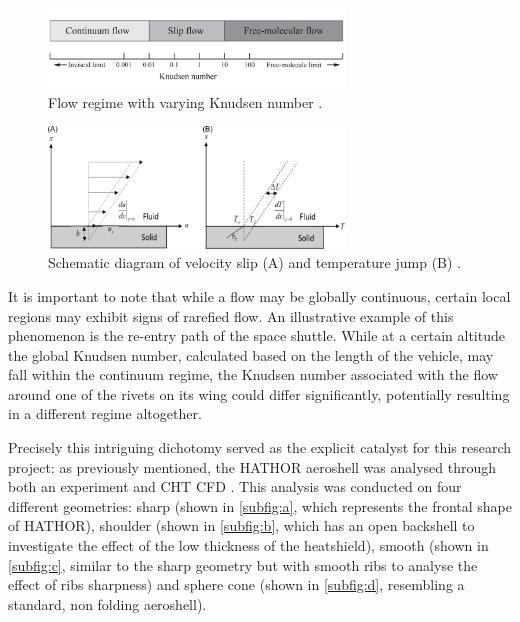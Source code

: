 \begin{figure}[ht]
    \centering
    \includegraphics[width=0.7\textwidth]{../Images/2. Background/regimes.png}
    \caption{Flow regime with varying Knudsen number \cite{aerothermonotes}.}
    \label{fig:regimes}
\end{figure}

\begin{figure}[ht]
    \centering
    \includegraphics[width=0.7\textwidth]{../Images/2. Background/slipjump.png}
    \caption{Schematic diagram of velocity slip (A) and temperature jump (B)  \cite{slipjump}.}
    \label{fig:slipjump}
\end{figure}
It is important to note that while a flow may be globally continuous, certain local regions may exhibit signs of rarefied flow. An illustrative example of this phenomenon is the re-entry path of the space shuttle. While at a certain altitude the global Knudsen number, calculated based on the length of the vehicle, may fall within the continuum regime, the Knudsen number associated with the flow around one of the rivets on its wing could differ significantly, potentially resulting in a different regime altogether.

Precisely this intriguing dichotomy served as the explicit catalyst for this research project: as previously mentioned, the HATHOR aeroshell was analysed through both an experiment and CHT CFD \cite{hathoraero2}. This analysis was conducted on four different geometries: sharp (shown in \autoref{subfig:a}, which represents the frontal shape of HATHOR), shoulder (shown in \autoref{subfig:b}, which has an open backshell to investigate the effect of the low thickness of the heatshield), smooth (shown in \autoref{subfig:c}, similar to the sharp geometry but with smooth ribs to analyse the effect of ribs sharpness) and sphere cone (shown in \autoref{subfig:d}, resembling a standard, non folding aeroshell).

